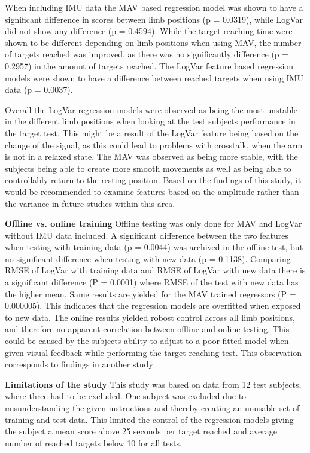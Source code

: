 When including IMU data the MAV based regression model was shown to have a significant difference in scores between limb positions (p = 0.0319), while LogVar did not show any difference (p = 0.4594). While the target reaching time were shown to be different depending on limb positions when using MAV, the number of targets reached was improved, as there was no significantly difference (p = 0.2957) in the amount of targets reached. The LogVar feature based regression models were shown to have a difference between reached targets when using IMU data (p = 0.0037).

Overall the LogVar regression models were observed as being the most unstable in the different limb positions when looking at the test subjects performance in the target test. This might be a result of the LogVar feature being based on the change of the signal, as this could lead to problems with crosstalk, when the arm is not in a relaxed state. The MAV was observed as being more stable, with the subjects being able to create more smooth movements as well as being able to controllably return to the resting position. Based on the findings of this study, it would be recommended to examine features based on the amplitude rather than the variance in future studies within this area.


\textbf{Offline vs. online training}
Offline testing was only done for MAV and LogVar without IMU data included. A significant difference between the two features when testing with training data (p = 0.0044) was archived in the offline test, but no significant difference when testing with new data (p = 0.1138). Comparing RMSE of LogVar with training data and RMSE of LogVar with new data there is a significant difference (P = 0.0001) where RMSE of the test with new data has the higher mean. Same results are yielded for the MAV trained regressors (P = 0.000005). This indicates that the regression models are overfitted when exposed to new data. The online results yielded robost control across all limb positions, and therefore no apparent correlation between offline and online testing. This could be caused by the subjects ability to adjust to a poor fitted model when given visual feedback while performing the target-reaching test. This observation corresponds to findings in another study \cite{jiang2010}.


\textbf{Limitations of the study}
This study was based on data from 12 test subjects, where three had to be excluded. One subject was excluded due to misunderstanding the given instructions and thereby creating an unusable set of training and test data. This limited the control of the regression models giving the subject a mean score above 25 seconds per target reached and average number of reached targets below 10 for all tests.

